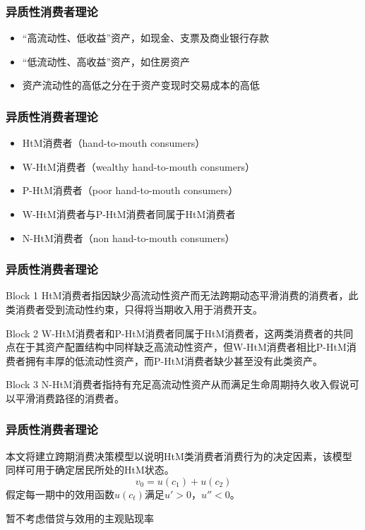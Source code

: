 \documentclass{beamer}
\begin{document}
\begin{frame}
\frametitle{异质性消费者理论}
\begin{itemize}
\item “高流动性、低收益”资产，如现金、支票及商业银行存款
\item “低流动性、高收益”资产，如住房资产
\item 资产流动性的高低之分在于资产变现时交易成本的高低
\end{itemize}
\end{frame}

\begin{frame}
\frametitle{异质性消费者理论}
\begin{itemize}
\item HtM消费者（hand-to-mouth consumers）
\item W-HtM消费者（wealthy hand-to-mouth consumers）
\item P-HtM消费者（poor hand-to-mouth consumers）
\item W-HtM消费者与P-HtM消费者同属于HtM消费者
\item N-HtM消费者（non hand-to-mouth consumers）
\end{itemize}
\end{frame}

\begin{frame}
\frametitle{异质性消费者理论}
\begin{block}{Block 1}
HtM消费者指因缺少高流动性资产而无法跨期动态平滑消费的消费者，此类消费者受到流动性约束，只得将当期收入用于消费开支。
\end{block}
  
\begin{block}{Block 2}
W-HtM消费者和P-HtM消费者同属于HtM消费者，这两类消费者的共同点在于其资产配置结构中同样缺乏高流动性资产，但W-HtM消费者相比P-HtM消费者拥有丰厚的低流动性资产，而P-HtM消费者缺少甚至没有此类资产。
\end{block}
    
\begin{block}{Block 3}
N-HtM消费者指持有充足高流动性资产从而满足生命周期持久收入假说可以平滑消费路径的消费者。
\end{block}
\end{frame}

\begin{frame}
\frametitle{异质性消费者理论}
本文将建立跨期消费决策模型以说明HtM类消费者消费行为的决定因素，该模型同样可用于确定居民所处的HtM状态。
\begin{equation*} 
v_0=u(c_1)+u(c_2) 
\end{equation*}
假定每一期中的效用函数$u(c_t)$满足$u'>0$，$u''<0$。

暂不考虑借贷与效用的主观贴现率
\end{frame}
\end{document}
